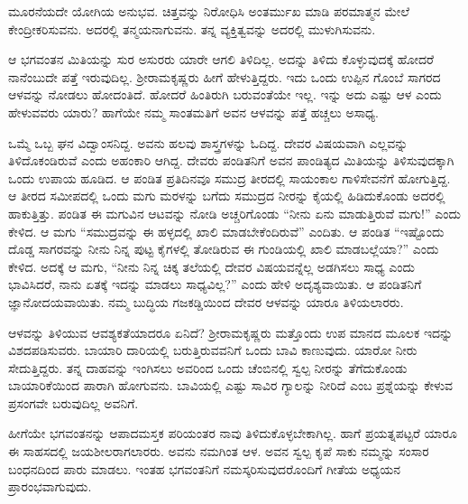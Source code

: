 ಮೂರನೆಯದೇ ಯೋಗಿಯ ಅನುಭವ. ಚಿತ್ತವನ್ನು ನಿರೋಧಿಸಿ ಅಂತರ್ಮುಖ ಮಾಡಿ ಪರಮಾತ್ಮನ ಮೇಲೆ ಕೇಂದ್ರೀಕರಿಸುವನು. ಅದರಲ್ಲಿ ತನ್ಮಯನಾಗುವನು. ತನ್ನ ವ್ಯಕ್ತಿತ್ವವನ್ನು ಅದರಲ್ಲಿ ಮುಳುಗಿಸುವನು.

ಆ ಭಗವಂತನ ಮಿತಿಯನ್ನು ಸುರ ಅಸುರರು ಯಾರೇ ಆಗಲಿ ತಿಳಿದಿಲ್ಲ. ಅದನ್ನು ತಿಳಿದು ಕೊಳ್ಳುವುದಕ್ಕೆ ಹೋದರೆ ನಾನೆಂಬುದೇ ಪತ್ತೆ ಇರುವುದಿಲ್ಲ. ಶ್ರೀರಾಮಕೃಷ್ಣರು ಹೀಗೆ ಹೇಳುತ್ತಿದ್ದರು. ಇದು ಒಂದು ಉಪ್ಪಿನ ಗೊಂಬೆ ಸಾಗರದ ಆಳವನ್ನು ನೋಡಲು ಹೋದಂತಿದೆ. ಹೋದರೆ ಹಿಂತಿರುಗಿ ಬರುವಂತೆಯೇ ಇಲ್ಲ. ಇನ್ನು ಅದು ಎಷ್ಟು ಆಳ ಎಂದು ಹೇಳುವವರು ಯಾರು? ಹಾಗೆಯೇ ನಮ್ಮ ಸಾಂತಮತಿಗೆ ಅವನ ಆಳವನ್ನು ಪತ್ತೆ ಹಚ್ಚಲು ಅಸಾಧ್ಯ.

ಒಮ್ಮೆ ಒಬ್ಬ ಘನ ವಿದ್ವಾಂಸನಿದ್ದ. ಅವನು ಹಲವು ಶಾಸ್ತ್ರಗಳನ್ನು ಓದಿದ್ದ. ದೇವರ ವಿಷಯವಾಗಿ ಎಲ್ಲವನ್ನು ತಿಳಿದೊಕಂಡಿರುವೆ ಎಂದು ಅಹಂಕಾರಿ ಆಗಿದ್ದ. ದೇವರು ಪಂಡಿತನಿಗೆ ಅವನ ಪಾಂಡಿತ್ಯದ ಮಿತಿಯನ್ನು ತಿಳಿಸುವುದಕ್ಕಾಗಿ ಒಂದು ಉಪಾಯ ಹೂಡಿದ. ಆ ಪಂಡಿತ ಪ್ರತಿದಿನವೂ ಸಮುದ್ರ ತೀರದಲ್ಲಿ ಸಾಯಂಕಾಲ ಗಾಳಿಸೇವನೆಗೆ ಹೋಗುತ್ತಿದ್ದ. ಆ ತೀರದ ಸಮೀಪದಲ್ಲಿ ಒಂದು ಮಗು ಮರಳನ್ನು ಬಗೆದು ಸಮುದ್ರದ ನೀರನ್ನು ಕೈಯಲ್ಲಿ ಹಿಡಿದುಕೊಂಡು ಅದರಲ್ಲಿ ಹಾಕುತ್ತಿತ್ತು. ಪಂಡಿತ ಈ ಮಗುವಿನ ಆಟವನ್ನು ನೋಡಿ ಅಚ್ಚರಿಗೊಂಡು “ನೀನು ಏನು ಮಾಡುತ್ತಿರುವೆ ಮಗು!” ಎಂದು ಕೇಳಿದ. ಆ ಮಗು “ಸಮುದ್ರವನ್ನು ಈ ಹಳ್ಳದಲ್ಲಿ ಖಾಲಿ ಮಾಡಬೇಕೆಂದಿರುವೆ” ಎಂದಿತು. ಆ ಪಂಡಿತ “ಇಷ್ಟೊಂದು ದೊಡ್ಡ ಸಾಗರವನ್ನು ನೀನು ನಿನ್ನ ಪುಟ್ಟ ಕೈಗಳಲ್ಲಿ ತೋಡಿರುವ ಈ ಗುಂಡಿಯಲ್ಲಿ ಖಾಲಿ ಮಾಡಬಲ್ಲೆಯಾ?” ಎಂದು ಕೇಳಿದ. ಅದಕ್ಕೆ ಆ ಮಗು, “ನೀನು ನಿನ್ನ ಚಿಕ್ಕ ತಲೆಯಲ್ಲಿ ದೇವರ ವಿಷಯವನ್ನೆಲ್ಲ ಅಡಗಿಸಲು ಸಾಧ್ಯ ಎಂದು ಭಾವಿಸಿದರೆ, ನಾನು ಏತಕ್ಕೆ ಇದನ್ನು ಮಾಡಲು ಸಾಧ್ಯವಿಲ್ಲ?” ಎಂದು ಹೇಳಿ ಅದೃಶ್ಯವಾಯಿತು. ಆ ಪಂಡಿತನಿಗೆ ಜ್ಞಾನೋದಯವಾಯಿತು. ನಮ್ಮ ಬುದ್ಧಿಯ ಗಜಕಡ್ಡಿಯಿಂದ ದೇವರ ಆಳವನ್ನು ಯಾರೂ ತಿಳಿಯಲಾರರು.

ಆಳವನ್ನು ತಿಳಿಯುವ ಆವಶ್ಯಕತೆಯಾದರೂ ಏನಿದೆ? ಶ್ರೀರಾಮಕೃಷ್ಣರು ಮತ್ತೊಂದು ಉಪ ಮಾನದ ಮೂಲಕ ಇದನ್ನು ವಿಶದಪಡಿಸುವರು. ಬಾಯಾರಿ ದಾರಿಯಲ್ಲಿ ಬರುತ್ತಿರುವವನಿಗೆ ಒಂದು ಬಾವಿ ಕಾಣುವುದು. ಯಾರೋ ನೀರು ಸೇದುತ್ತಿದ್ದರು. ತನ್ನ ದಾಹವನ್ನು ಇಂಗಿಸಲು ಅವರಿಂದ ಒಂದು ಚೆಂಬಿನಲ್ಲಿ ಸ್ವಲ್ಪ ನೀರನ್ನು ತೆಗೆದುಕೊಂಡು ಬಾಯಾರಿಕೆಯಿಂದ ಪಾರಾಗಿ ಹೋಗುವನು. ಬಾವಿಯಲ್ಲಿ ಎಷ್ಟು ಸಾವಿರ ಗ್ಯಾಲನ್ನು ನೀರಿದೆ ಎಂಬ ಪ್ರಶ್ನೆಯನ್ನು ಕೇಳುವ ಪ್ರಸಂಗವೇ ಬರುವುದಿಲ್ಲ ಅವನಿಗೆ.

ಹೀಗೆಯೇ ಭಗವಂತನನ್ನು ಆಪಾದಮಸ್ತಕ ಪರಿಯಂತರ ನಾವು ತಿಳಿದುಕೊಳ್ಳಬೇಕಾಗಿಲ್ಲ. ಹಾಗೆ ಪ್ರಯತ್ನಪಟ್ಟರೆ ಯಾರೂ ಈ ಸಾಹಸದಲ್ಲಿ ಜಯಶೀಲರಾಗಲಾರರು. ಅವನು ನಮಗಿಂತ ಆಳ. ಅವನ ಸ್ವಲ್ಪ ಕೃಪೆ ಸಾಕು ನಮ್ಮನ್ನು ಸಂಸಾರ ಬಂಧನದಿಂದ ಪಾರು ಮಾಡಲು. ಇಂತಹ ಭಗವಂತನಿಗೆ ನಮಸ್ಕರಿಸುವುದರೊಂದಿಗೆ ಗೀತೆಯ ಅಧ್ಯಯನ ಪ್ರಾರಂಭವಾಗುವುದು.


